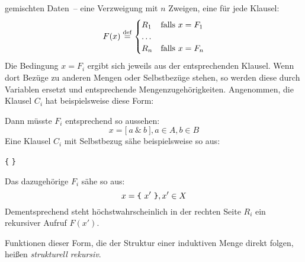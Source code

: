 gemischten Daten~-- eine Verzweigung mit $n$
Zweigen, eine für jede Klausel:
%
\begin{displaymath}
   F(x) \stackrel{\rm def}{=}
  \begin{cases}
    R_1 & \textrm{falls } x = F_1
    \\
    \ldots
    \\
    R_n & \textrm{falls } x = F_n
  \end{cases}
\end{displaymath}
%
Die Bedingung $x = F_i$ ergibt sich jeweils aus der entsprechenden
Klausel.  Wenn dort Bezüge zu anderen Mengen oder Selbstbezüge stehen,
so werden diese durch Variablen ersetzt und entsprechende
Mengenzugehörigkeiten.  Angenommen, die Klausel $C_i$ hat beispielsweise diese
Form:
\begin{grammar}
\end{grammar}
%
Dann müsste $F_i$ entsprechend so aussehen:
%
\begin{displaymath}
  x = \mathtt{[}~a~\mathtt{\&}~b~\mathtt{]}, a\in A, b\in B
\end{displaymath}
%
Eine Klausel $C_i$ mit Selbstbezug sähe beispielsweise so aus:
%
\begin{grammar}
  \> \verb|{|  \verb|}|
\end{grammar}
%
Das dazugehörige $F_i$ sähe so aus:
%
\begin{displaymath}
  x = \verb|{|~x'~\verb|}|, x'\in X
\end{displaymath}
%
Dementsprechend steht höchstwahrscheinlich in der rechten Seite $R_i$
ein rekursiver Aufruf $F(x')$.

Funktionen dieser Form, die der Struktur einer induktiven Menge direkt
folgen, heißen \textit{strukturell rekursiv}.  

